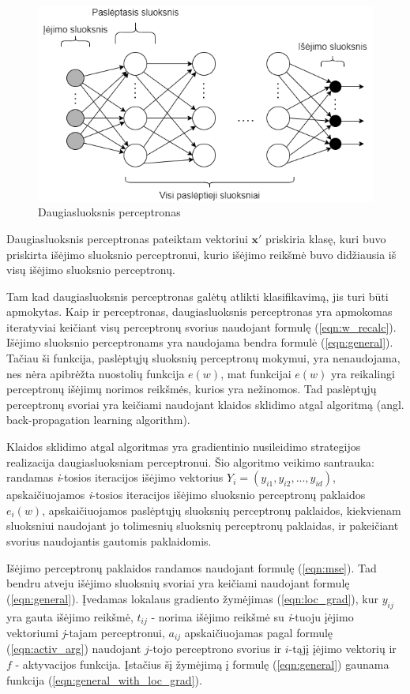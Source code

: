 \begin{figure}[H]
	\centering
	\includegraphics[scale=0.5]{img/neural_network.png}
	\caption{Daugiasluoksnis perceptronas}
	\label{img:nn}
\end{figure}

Daugiasluoksnis perceptronas pateiktam vektoriui $\boldsymbol{x}'$ priskiria klasę, kuri buvo priskirta išėjimo sluoksnio perceptronui, kurio išėjimo reikšmė buvo didžiausia iš visų išėjimo sluoksnio perceptronų.

Tam kad daugiasluoksnis perceptronas galėtų atlikti klasifikavimą, jis turi būti apmokytas. Kaip ir perceptronas, daugiasluoksnis perceptronas yra apmokomas iteratyviai keičiant visų perceptronų svorius naudojant formulę (\ref{eqn:w_recalc}). Išėjimo sluoksnio perceptronams yra naudojama bendra formulė (\ref{eqn:general}). Tačiau ši funkcija, paslėptųjų sluoksnių perceptronų mokymui, yra nenaudojama, nes nėra apibrėžta nuostolių funkcija $e(w)$, mat funkcijai $e(w)$ yra reikalingi perceptronų išėjimų norimos reikšmės, kurios yra nežinomos. Tad paslėptųjų perceptronų svoriai yra keičiami naudojant klaidos sklidimo atgal algoritmą (angl. back-propagation learning algorithm).

Klaidos sklidimo atgal algoritmas yra gradientinio nusileidimo strategijos realizacija daugiasluoksniam perceptronui. Šio algoritmo veikimo santrauka: randamas \textit{i}-tosios iteracijos išėjimo vektorius $Y_i = (y_{i1}, y_{i2}, ..., y_{id})$, apskaičiuojamos \textit{i}-tosios iteracijos išėjimo sluoksnio perceptronų paklaidos $e_i(w)$, apskaičiuojamos paslėptųjų sluoksnių perceptronų paklaidos, kiekvienam sluoksniui naudojant jo tolimesnių sluoksnių perceptronų paklaidas, ir pakeičiant svorius naudojantis gautomis paklaidomis.

Išėjimo perceptronų paklaidos randamos naudojant formulę (\ref{eqn:mse}). Tad bendru atveju išėjimo sluoksnių svoriai yra keičiami naudojant formulę (\ref{eqn:general}). Įvedamas lokalaus gradiento žymėjimas (\ref{eqn:loc_grad}), kur $y_{ij}$ yra gauta išėjimo reikšmė, $t_{ij}$ - norima išėjimo reikšmė su \textit{i}-tuoju įėjimo vektoriumi \textit{j}-tajam perceptronui, $a_{ij}$ apskaičiuojamas pagal formulę (\ref{eqn:activ_arg}) naudojant $j$-tojo perceptrono svorius ir $i$-tąjį įėjimo vektorių ir $f$ - aktyvacijos funkcija. Įstačius šį žymėjimą į formulę (\ref{eqn:general}) gaunama funkcija (\ref{eqn:general_with_loc_grad}).

